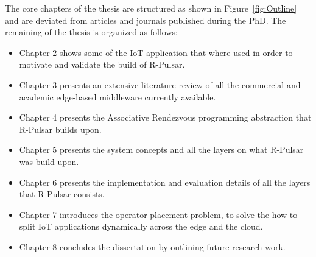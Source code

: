 The core chapters of the thesis are structured as shown in Figure~\ref{fig:Outline} and are deviated from articles and journals published during the PhD. The remaining of the thesis is organized as follows: 

\begin{itemize}
    \item Chapter 2 shows some of the IoT application that where used in order to motivate and validate the build of R-Pulsar.  
    \item Chapter 3 presents an extensive literature review of all the commercial and academic edge-based middleware currently available. 
    \item Chapter 4 presents the Associative Rendezvous programming abstraction that R-Pulsar builds upon.
    \item Chapter 5 presents the system concepts and all the layers on what R-Pulsar was build upon. 
    \item Chapter 6 presents the implementation and evaluation details of all the layers that R-Pulsar consists. 
    \item Chapter 7 introduces the operator placement problem, to solve the how to split IoT applications dynamically across the edge and the cloud. 
    \item Chapter 8 concludes the dissertation by outlining future research work.
\end{itemize}

